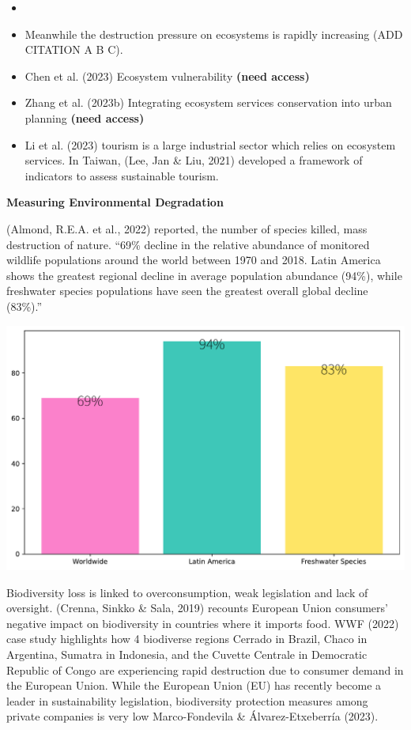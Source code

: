 \documentclass[
  letterpaper,
  DIV=11,
  numbers=noendperiod]{scrartcl}
\begin{document}
\begin{itemize}
\item
\item
  Meanwhile the destruction pressure on ecosystems is rapidly increasing
  (ADD CITATION A B C).
\item
  Chen et al. (2023) Ecosystem vulnerability \textbf{(need access)}
\item
  Zhang et al. (2023b) Integrating ecosystem services conservation into
  urban planning \textbf{(need access)}
\item
  Li et al. (2023) tourism is a large industrial sector which relies on
  ecosystem services. In Taiwan, (Lee, Jan \& Liu, 2021) developed a
  framework of indicators to assess sustainable tourism.
\end{itemize}

\textbf{Measuring Environmental Degradation}

(Almond, R.E.A. et al., 2022) reported, the number of species killed,
mass destruction of nature. ``69\% decline in the relative abundance of
monitored wildlife populations around the world between 1970 and 2018.
Latin America shows the greatest regional decline in average population
abundance (94\%), while freshwater species populations have seen the
greatest overall global decline (83\%).''

\includegraphics{_thesis_files/figure-pdf/cell-18-output-1.pdf}

Biodiversity loss is linked to overconsumption, weak legislation and
lack of oversight. (Crenna, Sinkko \& Sala, 2019) recounts European
Union consumers' negative impact on biodiversity in countries where it
imports food. WWF (2022) case study highlights how 4 biodiverse regions
Cerrado in Brazil, Chaco in Argentina, Sumatra in Indonesia, and the
Cuvette Centrale in Democratic Republic of Congo are experiencing rapid
destruction due to consumer demand in the European Union. While the
European Union (EU) has recently become a leader in sustainability
legislation, biodiversity protection measures among private companies is
very low Marco-Fondevila \& Álvarez-Etxeberría (2023).
\end{document}

